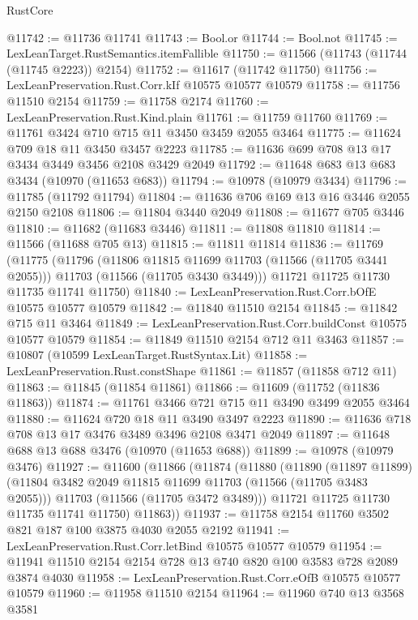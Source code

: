 \begin{lexlean}{RustCore}
\begin{coremodule}
@11742 := @11736 @11741
@11743 := Bool.or
@11744 := Bool.not
@11745 := LexLeanTarget.RustSemantics.itemFallible
@11750 := @11566 (@11743 (@11744 (@11745 @2223)) @2154)
@11752 := @11617 (@11742 @11750)
@11756 := LexLeanPreservation.Rust.Corr.kIf @10575 @10577 @10579
@11758 := @11756 @11510 @2154
@11759 := @11758 @2174
@11760 := LexLeanPreservation.Rust.Kind.plain
@11761 := @11759 @11760
@11769 := @11761 @3424 @710 @715 @11 @3450 @3459 @2055 @3464
@11775 := @11624 @709 @18 @11 @3450 @3457 @2223
@11785 := @11636 @699 @708 @13 @17 @3434 @3449 @3456 @2108 @3429 @2049
@11792 := @11648 @683 @13 @683 @3434 (@10970 (@11653 @683))
@11794 := @10978 (@10979 @3434)
@11796 := @11785 (@11792 @11794)
@11804 := @11636 @706 @169 @13 @16 @3446 @2055 @2150 @2108
@11806 := @11804 @3440 @2049
@11808 := @11677 @705 @3446
@11810 := @11682 (@11683 @3446)
@11811 := @11808 @11810
@11814 := @11566 (@11688 @705 @13)
@11815 := @11811 @11814
@11836 := @11769
    (@11775
      (@11796
        (@11806 @11815 @11699 @11703 (@11566 (@11705 @3441 @2055)))
        @11703
        (@11566 (@11705 @3430 @3449)))
      @11721
      @11725
      @11730
      @11735
      @11741
      @11750)
@11840 := LexLeanPreservation.Rust.Corr.bOfE @10575 @10577 @10579
@11842 := @11840 @11510 @2154
@11845 := @11842 @715 @11 @3464
@11849 := LexLeanPreservation.Rust.Corr.buildConst @10575 @10577 @10579
@11854 := @11849 @11510 @2154 @712 @11 @3463
@11857 := @10807 (@10599 LexLeanTarget.RustSyntax.Lit)
@11858 := LexLeanPreservation.Rust.constShape
@11861 := @11857 (@11858 @712 @11)
@11863 := @11845 (@11854 @11861)
@11866 := @11609 (@11752 (@11836 @11863))
@11874 := @11761 @3466 @721 @715 @11 @3490 @3499 @2055 @3464
@11880 := @11624 @720 @18 @11 @3490 @3497 @2223
@11890 := @11636 @718 @708 @13 @17 @3476 @3489 @3496 @2108 @3471 @2049
@11897 := @11648 @688 @13 @688 @3476 (@10970 (@11653 @688))
@11899 := @10978 (@10979 @3476)
@11927 := @11600
    (@11866
      (@11874
        (@11880
          (@11890
            (@11897 @11899)
            (@11804 @3482 @2049 @11815 @11699 @11703 (@11566 (@11705 @3483 @2055)))
            @11703
            (@11566 (@11705 @3472 @3489)))
          @11721
          @11725
          @11730
          @11735
          @11741
          @11750)
        @11863))
@11937 := @11758 @2154 @11760 @3502 @821 @187 @100 @3875 @4030 @2055 @2192
@11941 := LexLeanPreservation.Rust.Corr.letBind @10575 @10577 @10579
@11954 := @11941 @11510 @2154 @2154 @728 @13 @740 @820 @100 @3583 @728 @2089 @3874 @4030
@11958 := LexLeanPreservation.Rust.Corr.eOfB @10575 @10577 @10579
@11960 := @11958 @11510 @2154
@11964 := @11960 @740 @13 @3568 @3581

\end{coremodule}
\end{lexlean}
